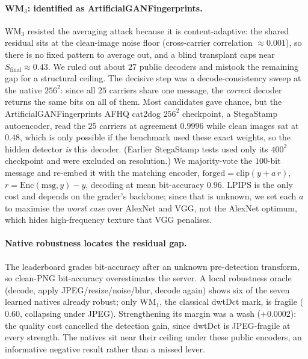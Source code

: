 \documentclass{article} %
\begin{document}
\paragraph{WM$_3$: identified as ArtificialGANFingerprints.}
WM$_3$ resisted the averaging attack because it is content-adaptive: the shared residual sits at the
clean-image noise floor (cross-carrier correlation $\approx0.001$), so there is no fixed pattern to average
out, and a blind transplant caps near $S_\text{final}\approx0.43$. We ruled out about $27$ public decoders and
mistook the remaining gap for a structural ceiling. The decisive step was a decode-consistency sweep at the
native $256^2$: since all $25$ carriers share one message, the \emph{correct} decoder returns the same bits on
all of them. Most candidates gave chance, but the ArtificialGANFingerprints \citep{yu2021artificial} AFHQ
cat2dog $256^2$ checkpoint, a StegaStamp \citep{tancik2020stegastamp} autoencoder, read the $25$ carriers at
agreement $0.9996$ while clean images sat at $0.48$, which is only possible if the benchmark used these exact
weights, so the hidden detector \emph{is} this decoder. (Earlier StegaStamp tests used only its $400^2$
checkpoint and were excluded on resolution.) We majority-vote the $100$-bit message and re-embed it with the
matching encoder, $\text{forged}=\mathrm{clip}(y+a\,r)$, $r=\mathrm{Enc}(\text{msg},y)-y$, decoding at mean
bit-accuracy $0.96$. LPIPS is the only cost and depends on the grader's backbone; since that is unknown, we
set each $a$ to maximise the \emph{worst case} over AlexNet and VGG, not the AlexNet optimum, which hides
high-frequency texture that VGG penalises.

\paragraph{Native robustness locates the residual gap.}
The leaderboard grades bit-accuracy after an unknown pre-detection transform, so clean-PNG bit-accuracy
overestimates the server. A local robustness oracle (decode, apply JPEG/resize/noise/blur, decode again) shows
six of the seven learned natives already robust; only WM$_1$, the classical dwtDct mark, is fragile ($0.60$,
collapsing under JPEG). Strengthening its margin was a wash ($+0.0002$): the quality cost cancelled the
detection gain, since dwtDct is JPEG-fragile at every strength. The natives sit near their ceiling under these
public encoders, an informative negative result rather than a missed lever.

\end{document}
